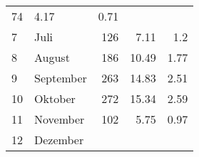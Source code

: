 \begin{longtable}{lXrrr}
       \num{74} &
       \num[round-mode=places,round-precision=2]{4.17} &
         \num[round-mode=places,round-precision=2]{0.71} \\

     7 &
     \multicolumn{1}{X}{ Juli   } &


       \num{126} &
       \num[round-mode=places,round-precision=2]{7.11} &
         \num[round-mode=places,round-precision=2]{1.2} \\

     8 &
     \multicolumn{1}{X}{ August   } &


       \num{186} &
       \num[round-mode=places,round-precision=2]{10.49} &
         \num[round-mode=places,round-precision=2]{1.77} \\

     9 &
     \multicolumn{1}{X}{ September   } &


       \num{263} &
       \num[round-mode=places,round-precision=2]{14.83} &
         \num[round-mode=places,round-precision=2]{2.51} \\

     10 &
     \multicolumn{1}{X}{ Oktober   } &


       \num{272} &
       \num[round-mode=places,round-precision=2]{15.34} &
         \num[round-mode=places,round-precision=2]{2.59} \\

     11 &
     \multicolumn{1}{X}{ November   } &


       \num{102} &
       \num[round-mode=places,round-precision=2]{5.75} &
         \num[round-mode=places,round-precision=2]{0.97} \\

     12 &
     \multicolumn{1}{X}{ Dezember   } &



\end{longtable}

